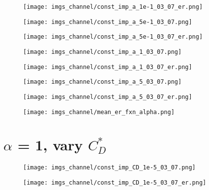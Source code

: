 \documentclass[12pt,a4paper]{article}
\begin{document}
\begin{figure}
\centering
\texttt{[image: imgs\_channel/const\_imp\_a\_1e-1\_03\_07\_er.png]}
\end{figure}

\begin{figure}
\centering
\texttt{[image: imgs\_channel/const\_imp\_a\_5e-1\_03\_07.png]}
\end{figure}

\begin{figure}
\centering
\texttt{[image: imgs\_channel/const\_imp\_a\_5e-1\_03\_07\_er.png]}
\end{figure}

\begin{figure}
\centering
\texttt{[image: imgs\_channel/const\_imp\_a\_1\_03\_07.png]}
\end{figure}

\begin{figure}
\centering
\texttt{[image: imgs\_channel/const\_imp\_a\_1\_03\_07\_er.png]}
\end{figure}

\begin{figure}
\centering
\texttt{[image: imgs\_channel/const\_imp\_a\_5\_03\_07.png]}
\end{figure}

\begin{figure}
\centering
\texttt{[image: imgs\_channel/const\_imp\_a\_5\_03\_07\_er.png]}
\end{figure}

\begin{figure}
\centering
\texttt{[image: imgs\_channel/mean\_er\_fxn\_alpha.png]}
\end{figure}

\section{$\alpha$ = 1, vary $C_D^*$}
\newpage

\begin{figure}[h!]
\centering
\texttt{[image: imgs\_channel/const\_imp\_CD\_1e-5\_03\_07.png]}
\end{figure}

\begin{figure}[h!]
\centering
\texttt{[image: imgs\_channel/const\_imp\_CD\_1e-5\_03\_07\_er.png]}
\end{figure}
\end{document}
